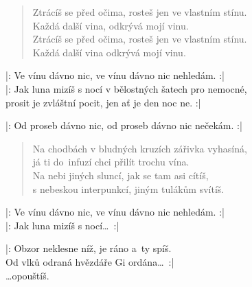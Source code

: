 \begin{song}{}
\begin{verse}
   Ztrácíš se před očima, rosteš jen ve vlastním stínu. \\
   Každá další vina, odkrývá mojí vinu. \\
   Ztrácíš se před očima, rosteš jen ve vlastním stínu. \\
   Každá další vina odkrývá mojí vinu.
\end{verse}
\begin{refren}
   |: Ve vínu dávno nic, ve vínu dávno nic nehledám. :| \\
   |: Jak luna mizíš s nocí v bělostných šatech pro nemocné, \\
   prosit je zvláštní pocit, jen ať je den noc ne. :|
\end{refren}
\begin{deco}
  |: Od proseb dávno nic, od proseb dávno nic nečekám. :|
\end{deco}
\begin{verse}
   Na chodbách v bludných kruzích zářivka  vyhasíná, \\
   já ti do~infuzí chci přilít trochu vína. \\
   Na nebi jiných sluncí, jak se tam asi cítíš, \\
   s nebeskou interpunkcí, jiným tulákům svítíš.
\end{verse}
\begin{refren}
   |: Ve vínu dávno nic, ve vínu dávno nic nehledám. :| \\
   |: Jak luna mizíš s nocí\ldots~:|
\end{refren}
\begin{deco}
   |: Obzor neklesne níž, je ráno a~ty spíš. \\
   Od vlků odraná hvězdáře Gi ordána\ldots~:|  \\
   \ldots opouštíš.
\end{deco}
  \begin{chords}
    \chordCmajSeven
  \end{chords}
\end{song}
\pagebreak
